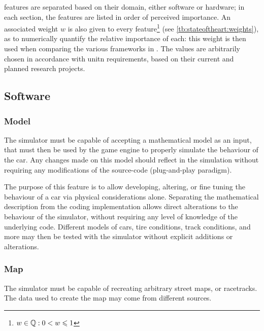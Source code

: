 \Glspl{feature} are separated based on their domain, either software or hardware; in each section, the \glspl{feature} are listed in order of perceived importance. An associated weight $w$ is also given to every \gls{feature}\footnote{$w \in \mathbb{Q}: 0 < w \leqslant 1$} (see \cref{tb:stateoftheart:weights}), as to numerically quantify the relative importance of each: this weight is then used when comparing the various \glspl{framework} in . The values are arbitrarily chosen in accordance with \gls{unitn} requirements, based on their current and planned research projects.



\subsection{Software}

\subsubsection{Model}

The simulator must be capable of accepting a mathematical model as an input, that must then be used by the game engine to properly simulate the behaviour of the car. Any changes made on this model should reflect in the simulation without requiring any modifications of the source-code (plug-and-play paradigm).

The purpose of this \gls{feature} is to allow developing, altering, or fine tuning the behaviour of a car via physical considerations alone. Separating the mathematical description from the coding implementation allows direct alterations to the behaviour of the simulator, without requiring any level of knowledge of the underlying code. Different models of cars, tire conditions, track conditions, and more may then be tested with the simulator without explicit additions or alterations.

\subsubsection{Map}

The simulator must be capable of recreating arbitrary street maps, or racetracks. The data used to create the map may come from different sources.

